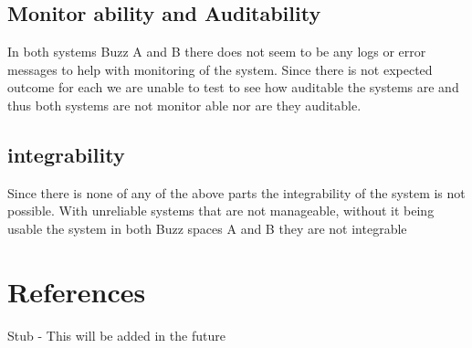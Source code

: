 \documentclass[12pt]{article}
\begin{document}
\subsection{Monitor ability and Auditability}
In both systems Buzz A and B there does not seem to be any logs or error messages to help with monitoring of the system. Since there is not expected outcome for each we are unable to test to see how auditable the systems are and thus both systems are not monitor able nor are they auditable.
\subsection{integrability}
Since there is none of any of the above parts the integrability of the system is not possible. With unreliable systems that are not manageable, without it being usable the system in both Buzz spaces A and B they are not integrable

\section{References}
Stub - This will be added in the future
\end{document}
